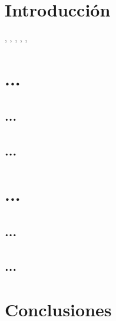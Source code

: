 \section{Introducción}
\cite{Abels:2003thesis}, \cite{Acero:1990reichenbach}, \cite{Ajdukiewicz:1935}, \cite{Bennett:1995courseGPSG}
\cite{Chomsky:2001DBP}, \cite{Chomsky:2000MI}, \cite{BenninCoveryDendikken:1998predicationNPs}
\section{...}
\subsection{...}

\subsection{...}

\section{...}

\subsection{...}

\subsection{...}

\section{Conclusiones}
